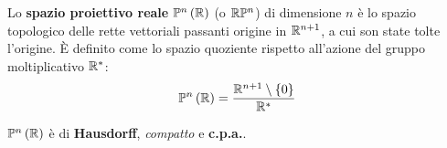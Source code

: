 \begin{define} \label{def spazio proiettivo}
	Lo \textbf{spazio proiettivo reale} $\mathbb{P}^n\left(\mathbb{R}\right)$ (o $\mathbb{R}\mathbb{P}^n$) di dimensione $n$ è lo spazio topologico delle rette vettoriali passanti origine in $\mathbb{R}^{n+1}$, a cui son state tolte l'origine. È definito come lo spazio quoziente rispetto all'azione del gruppo moltiplicativo $\mathbb{R}^{\ast}$:
	\begin{equation}
		\mathbb{P}^n\left(\mathbb{R}\right)= \frac{\mathbb{R}^{n+1}\setminus \left\{0\right\}}{\mathbb{R}^{\ast}}
	\end{equation}
\end{define}
\begin{proposition}\label{spazi proiettivi compatti connessi}
$\mathbb{P}^n\left(\mathbb{R}\right)$ è di \textbf{Hausdorff}, \textit{compatto} e \textbf{c.p.a.}.
\end{proposition}
